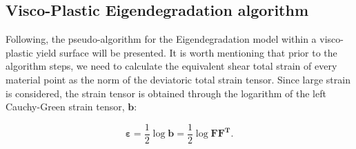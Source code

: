 \documentclass[applsci,journal,article,submit,moreauthors,pdftex]{Definitions/mdpi}
\begin{document}
\subsection{Visco-Plastic Eigendegradation algorithm}
Following, the pseudo-algorithm for the Eigendegradation model within a visco-plastic yield surface will be presented. It is worth mentioning that prior to the algorithm steps, we need to calculate the equivalent shear total strain of every material point as the norm of the deviatoric total strain tensor. Since large strain is considered, the strain tensor is obtained through the logarithm of the left Cauchy-Green strain tensor, $\mathbf{b}$:

\begin{equation}\label{eq21}
\boldsymbol{\varepsilon}=\frac{1}{2}\log\boldsymbol{b}=\frac{1}{2}\log\boldsymbol{F F^T}.
\end{equation}
\end{document}
